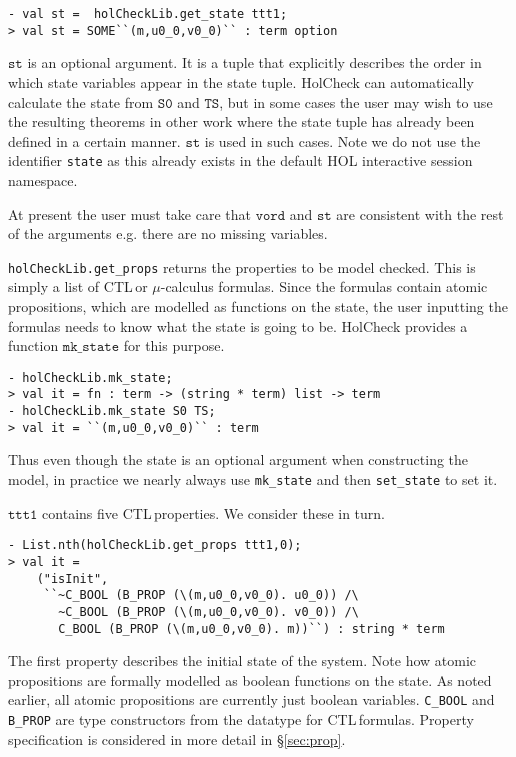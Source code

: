 \documentclass[12pt,fleqn]{article}
\newcommand{\ctl}{\textsf{CTL}\,}
\newcommand{\hc}{HolCheck}
\begin{document}
\begin{session}\begin{verbatim}
- val st =  holCheckLib.get_state ttt1;
> val st = SOME``(m,u0_0,v0_0)`` : term option
\end{verbatim}\end{session}
\(\mathtt{st}\) is an optional argument. It is a \HOL{} tuple that explicitly describes the order in which state variables appear in the state tuple. \hc{} can automatically calculate the state from \(\mathtt{S0}\) and \(\mathtt{TS}\), but in some cases the user may wish to use the resulting theorems in other work where the state tuple has already been defined in a certain manner. \(\mathtt{st}\) is used in such cases. Note we do not use the identifier \texttt{state} as this already exists in the default HOL interactive session namespace.

At present the user must take care that \(\mathtt{vord}\) and \(\mathtt{st}\) are consistent with the rest of the arguments e.g. there are no missing variables.

\texttt{holCheckLib.get\_props} returns the properties to be model checked. This is simply a list of \ctl or \(\mu\)-calculus formulas. Since the formulas contain atomic propositions, which are modelled as functions on the state, the user inputting the formulas needs to know what the state is going to be. \hc{} provides a function \(\mathtt{mk\_state}\) for this purpose.

\begin{session}
\begin{verbatim}
- holCheckLib.mk_state;
> val it = fn : term -> (string * term) list -> term
- holCheckLib.mk_state S0 TS;
> val it = ``(m,u0_0,v0_0)`` : term
\end{verbatim}
\end{session}

Thus even though the state is an optional argument when constructing the model, in practice we nearly always use \texttt{mk\_state} and then \texttt{set\_state} to set it.

\(\mathtt{ttt1}\) contains five \ctl properties. We consider these in turn.

\begin{session}
\begin{verbatim}
- List.nth(holCheckLib.get_props ttt1,0);
> val it =
    ("isInit",
     ``~C_BOOL (B_PROP (\(m,u0_0,v0_0). u0_0)) /\
       ~C_BOOL (B_PROP (\(m,u0_0,v0_0). v0_0)) /\
       C_BOOL (B_PROP (\(m,u0_0,v0_0). m))``) : string * term
\end{verbatim}
\end{session}
The first property describes the initial state of the system. Note how atomic propositions are formally modelled as boolean functions on the state. As noted earlier, all atomic propositions are currently just boolean variables. \texttt{C\_BOOL} and \texttt{B\_PROP} are type constructors from the \HOL{} datatype for \ctl formulas. Property specification is considered in more detail in \S\ref{sec:prop}.
\end{document}
